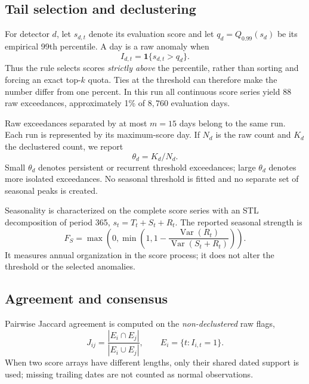 \documentclass[11pt,a4paper]{article}
\begin{document}
\subsection{Tail selection and declustering}
For detector $d$, let $s_{d,t}$ denote its evaluation score and let
$q_d=Q_{0.99}(s_d)$ be its empirical 99th percentile. A day is a raw anomaly
when
\begin{equation}
    I_{d,t}=\mathbf{1}\{s_{d,t}>q_d\}.
\end{equation}
Thus the rule selects scores \emph{strictly above} the percentile, rather than
sorting and forcing an exact top-$k$ quota. Ties at the threshold can therefore
make the number differ from one percent. In this run all continuous score
series yield 88 raw exceedances, approximately 1\% of $8{,}760$ evaluation days.

Raw exceedances separated by at most $m=15$ days belong to the same run. Each
run is represented by its maximum-score day. If $N_d$ is the raw count and
$K_d$ the declustered count, we report
\begin{equation}
    \theta_d=K_d/N_d.
\end{equation}
Small $\theta_d$ denotes persistent or recurrent threshold exceedances; large
$\theta_d$ denotes more isolated exceedances. No seasonal threshold is fitted
and no separate set of seasonal peaks is created.

Seasonality is characterized on the complete score series with an STL
decomposition \cite{stl} of period 365, $s_t=T_t+S_t+R_t$. The reported seasonal strength
is
\begin{equation}
    F_S=\max\!\left(0,\min\!\left(1,
       1-\frac{\operatorname{Var}(R_t)}
               {\operatorname{Var}(S_t+R_t)}\right)\right).
\end{equation}
It measures annual organization in the score process; it does not alter the
threshold or the selected anomalies.

\subsection{Agreement and consensus}
Pairwise Jaccard agreement is computed on the \emph{non-declustered} raw flags,
\begin{equation}
 J_{ij}=\frac{|E_i\cap E_j|}{|E_i\cup E_j|},\qquad
 E_i=\{t:I_{i,t}=1\}.
\end{equation}
When two score arrays have different lengths, only their shared dated support
is used; missing trailing dates are not counted as normal observations.
\end{document}
